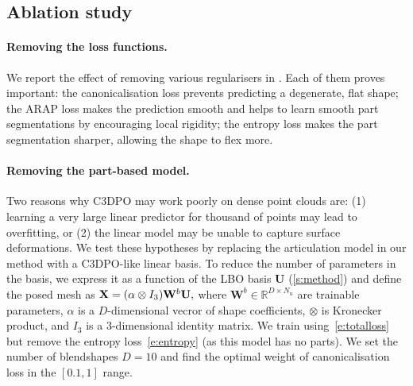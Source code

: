 

\subsection{Ablation study}

\paragraph{Removing the loss functions.}

We report the effect of removing various regularisers in .
Each of them proves important:
the canonicalisation loss prevents predicting a degenerate, flat shape;
the ARAP loss makes the prediction smooth and helps to learn smooth part segmentations by encouraging local rigidity;
the entropy loss makes the part segmentation sharper, allowing the shape to flex more.



\paragraph{Removing the part-based model.}

Two reasons why C3DPO may work poorly on dense point clouds are:
(1) learning a very large linear predictor for thousand of points may lead to overfitting, or
(2) the linear model may be unable to capture surface deformations.
We test these hypotheses by replacing the articulation model in our method with a C3DPO-like linear basis.
To reduce the number of parameters in the basis, we express it as a function of the LBO basis $\mathbf{U}$ (\cref{s:method}) and define the posed mesh as
$\label{e:lboc3dpo}
\mathbf{X} = (\alpha \otimes I_3) \mathbf{W}^b \mathbf{U},
$
where $\mathbf{W}^b \in \mathbb{R}^{D \times N_u}$ are trainable parameters, $\alpha$ is a $D$-dimensional vecror of shape coefficients, $\otimes$ is Kronecker product, and $I_3$ is a 3-dimensional identity matrix.
We train using~\cref{e:totalloss} but remove the entropy loss~\eqref{e:entropy} (as this model has no parts).
We set the number of blendshapes $D=10$ and find the optimal weight of canonicalisation loss in the $[0.1, 1]$ range.

